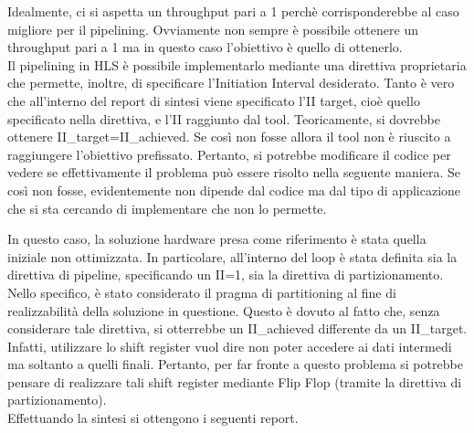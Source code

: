 Idealmente, ci si aspetta un throughput pari a 1 perchè corrisponderebbe al caso migliore per il pipelining. Ovviamente non sempre è possibile ottenere un throughput pari a 1 ma in questo caso l'obiettivo è quello di ottenerlo.
\\
Il pipelining in HLS è possibile implementarlo mediante una direttiva proprietaria che permette, inoltre, di specificare l'Initiation Interval desiderato. Tanto è vero che all'interno del report di sintesi viene specificato l'II target, cioè quello specificato nella direttiva, e l'II raggiunto dal tool. Teoricamente, si dovrebbe ottenere II\_target=II\_achieved. Se così non fosse allora il tool non è riuscito a raggiungere l'obiettivo prefissato. Pertanto, si potrebbe modificare il codice per vedere se effettivamente il problema può essere risolto nella seguente maniera. Se così non fosse, evidentemente non dipende dal codice ma dal tipo di applicazione che si sta cercando di implementare che non lo permette.



In questo caso, la soluzione hardware presa come riferimento è stata quella iniziale non ottimizzata. In particolare, all'interno del loop è stata definita sia la direttiva di pipeline, specificando un II=1, sia la direttiva di partizionamento. Nello specifico, è stato considerato il pragma di partitioning al fine di realizzabilità della soluzione in questione. Questo è dovuto al fatto che, senza considerare tale direttiva, si otterrebbe un II\_achieved differente da un II\_target. Infatti, utilizzare lo shift register vuol dire non poter accedere ai dati intermedi ma soltanto a quelli finali. Pertanto, per far fronte a questo problema si potrebbe pensare di realizzare tali shift register mediante Flip Flop (tramite la direttiva di partizionamento).
\\
Effettuando la sintesi si ottengono i seguenti report.

